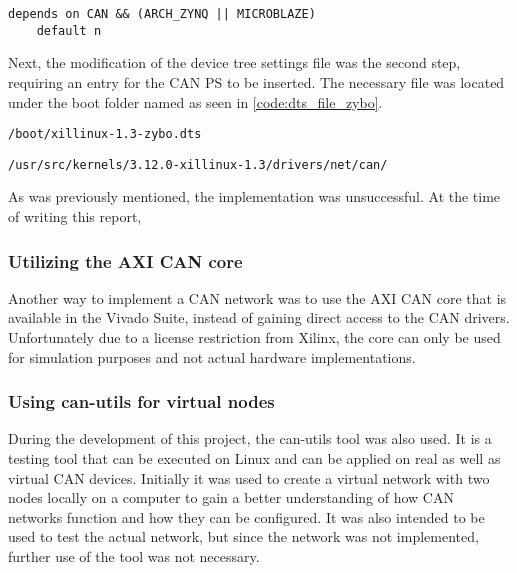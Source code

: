 \begin{lstlisting}[firstnumber=130,caption={Original content of lines 130 and 131.},label=code:can_kconfig_original_line130]
	depends on CAN && (ARCH_ZYNQ || MICROBLAZE)
	default n
\end{lstlisting}

Next, the modification of the device tree settings file was the second step, requiring an entry for the CAN PS to be inserted. The necessary file was located under the boot folder named as seen in \ref{code:dts_file_zybo}.

\begin{lstlisting}[numbers=none,caption={Device tree settings file and its path.},label=code:dts_file_zybo]
/boot/xillinux-1.3-zybo.dts
\end{lstlisting}

\begin{lstlisting}[caption={CAN Kconfig pathfile.},numbers=none,label=code:can_kconfig_pathfile]
/usr/src/kernels/3.12.0-xillinux-1.3/drivers/net/can/
\end{lstlisting}
As was previously mentioned, the implementation was unsuccessful. At the time of writing this report, 

\subsubsection{Utilizing the AXI CAN core}
Another way to implement a CAN network was to use the AXI CAN core that is available in the Vivado Suite, instead of gaining direct access to the CAN drivers. Unfortunately due to a license restriction from Xilinx, the core can only be used for simulation purposes and not actual hardware implementations.


\subsubsection{Using can-utils for virtual nodes}

During the development of this project, the can-utils tool was also used. It is a testing tool that can be executed on Linux and can be applied on real as well as virtual CAN devices. Initially it was used to create a virtual network with two nodes locally on a computer to gain a better understanding of how CAN networks function and how they can be configured. It was also intended to be used to test the actual network, but since the network was not implemented, further use of the tool was not necessary.

